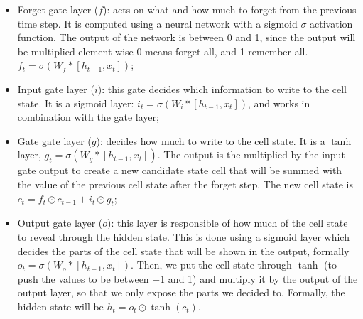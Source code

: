 \begin{itemize}[-]
    \item Forget gate layer ($f$): acts on what and how much to forget from the previous time step. It is computed using a neural network with a sigmoid $\sigma$ activation function. The output of the network is between 0 and 1, since the output will be multiplied element-wise 0 means forget all, and 1 remember all. $f_t = \sigma(W_f * [h_{t-1}, x_t])$;
    \item Input gate layer ($i$): this gate decides which information to write to the cell state. It is a sigmoid layer: $i_t = \sigma(W_i * [h_{t-1}, x_t])$, and works in combination with the gate layer; 
    \item Gate gate layer ($g$): decides how much to write to the cell state. It is a $\tanh$ layer, $g_t = \sigma(W_g * [h_{t-1}, x_t])$. The output is the multiplied by the input gate output to create a new candidate state cell that will be summed with the value of the previous cell state after the forget step. The new cell state is  $c_t = f_t \odot c_{t-1} + i_t \odot g_t$;
    \item Output gate layer ($o$): this layer is responsible of how much of the cell state to reveal through the hidden state. This is done using a sigmoid layer which decides the parts of the cell state that will be shown in the output, formally $o_t = \sigma(W_o * [h_{t-1}, x_t])$. Then, we put the cell state through $\tanh$ (to push the values to be between −1 and 1) and multiply it by the output of the output layer, so that we only expose the parts we decided to. Formally, the hidden state will be $h_t = o_t \odot \tanh(c_t)$.
\end{itemize}



